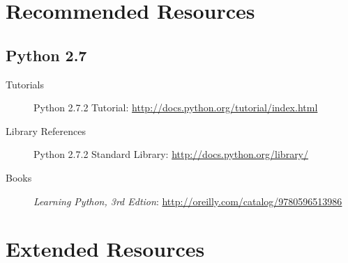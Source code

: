 

\chapter{Recommended Resources}
\section{Python 2.7}
\begin{description}
	\item[Tutorials]
Python 2.7.2 Tutorial: \url{http://docs.python.org/tutorial/index.html} \cite{website:Python272docs}
	\item[Library References]
Python 2.7.2 Standard Library:  \url{http://docs.python.org/library/} \cite{website:Python272docs}
	\item[Books]
\emph{Learning Python, 3rd Edtion}: \url{http://oreilly.com/catalog/9780596513986}  \cite{LearningPython3rd}
\end{description}

\chapter{Extended Resources}
